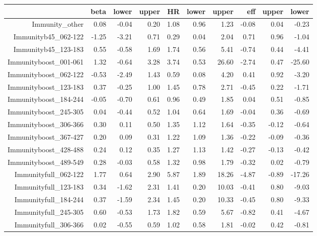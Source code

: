 \begin{table}[ht]
\centering
\begin{tabular}{rrrrrrrrrr}
  \hline
 & beta & lower & upper & HR & lower & upper & eff & upper & lower \\ 
  \hline
Immunity\_other & 0.08 & -0.04 & 0.20 & 1.08 & 0.96 & 1.23 & -0.08 & 0.04 & -0.23 \\ 
  Immunityb45\_062-122 & -1.25 & -3.21 & 0.71 & 0.29 & 0.04 & 2.04 & 0.71 & 0.96 & -1.04 \\ 
  Immunityb45\_123-183 & 0.55 & -0.58 & 1.69 & 1.74 & 0.56 & 5.41 & -0.74 & 0.44 & -4.41 \\ 
  Immunityboost\_001-061 & 1.32 & -0.64 & 3.28 & 3.74 & 0.53 & 26.60 & -2.74 & 0.47 & -25.60 \\ 
  Immunityboost\_062-122 & -0.53 & -2.49 & 1.43 & 0.59 & 0.08 & 4.20 & 0.41 & 0.92 & -3.20 \\ 
  Immunityboost\_123-183 & 0.37 & -0.25 & 1.00 & 1.45 & 0.78 & 2.71 & -0.45 & 0.22 & -1.71 \\ 
  Immunityboost\_184-244 & -0.05 & -0.70 & 0.61 & 0.96 & 0.49 & 1.85 & 0.04 & 0.51 & -0.85 \\ 
  Immunityboost\_245-305 & 0.04 & -0.44 & 0.52 & 1.04 & 0.64 & 1.69 & -0.04 & 0.36 & -0.69 \\ 
  Immunityboost\_306-366 & 0.30 & 0.11 & 0.50 & 1.35 & 1.12 & 1.64 & -0.35 & -0.12 & -0.64 \\ 
  Immunityboost\_367-427 & 0.20 & 0.09 & 0.31 & 1.22 & 1.09 & 1.36 & -0.22 & -0.09 & -0.36 \\ 
  Immunityboost\_428-488 & 0.24 & 0.12 & 0.35 & 1.27 & 1.13 & 1.42 & -0.27 & -0.13 & -0.42 \\ 
  Immunityboost\_489-549 & 0.28 & -0.03 & 0.58 & 1.32 & 0.98 & 1.79 & -0.32 & 0.02 & -0.79 \\ 
  Immunityfull\_062-122 & 1.77 & 0.64 & 2.90 & 5.87 & 1.89 & 18.26 & -4.87 & -0.89 & -17.26 \\ 
  Immunityfull\_123-183 & 0.34 & -1.62 & 2.31 & 1.41 & 0.20 & 10.03 & -0.41 & 0.80 & -9.03 \\ 
  Immunityfull\_184-244 & 0.37 & -1.59 & 2.34 & 1.45 & 0.20 & 10.33 & -0.45 & 0.80 & -9.33 \\ 
  Immunityfull\_245-305 & 0.60 & -0.53 & 1.73 & 1.82 & 0.59 & 5.67 & -0.82 & 0.41 & -4.67 \\ 
  Immunityfull\_306-366 & 0.02 & -0.55 & 0.59 & 1.02 & 0.58 & 1.81 & -0.02 & 0.42 & -0.81 \\ 

\end{tabular}
\end{table}
